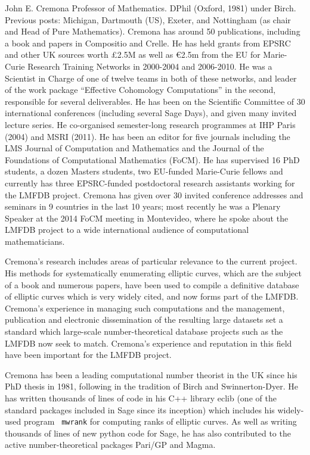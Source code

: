 \begin{participant}[type=leadPI,PM=3,gender=male]{John E. Cremona}
  Professor of Mathematics.  DPhil (Oxford, 1981) under Birch.
  Previous posts: Michigan, Dartmouth (US), Exeter, and Nottingham (as
  chair and Head of Pure Mathematics). Cremona has around 50
  publications, including a book and papers in Compositio and Crelle.
  He has held grants from EPSRC and other UK sources worth \pounds2.5M
  as well as \euro2.5m from the EU for Marie-Curie Research Training
  Networks in 2000-2004 and 2006-2010.  He was a Scientist in Charge
  of one of twelve teams in both of these networks, and leader of the
  work package ``Effective Cohomology Computations'' in the second,
  responsible for several deliverables.  He has been on the Scientific
  Committee of 30 international conferences (including several Sage
  Days), and given many invited lecture series.  He co-organised
  semester-long research programmes at IHP Paris (2004) and MSRI
  (2011).  He has been an editor for five journals including the LMS
  Journal of Computation and Mathematics and the Journal of the
  Foundations of Computational Mathematics (FoCM).  He has supervised
  16 PhD students, a dozen Masters students, two EU-funded Marie-Curie
  fellows and currently has three EPSRC-funded postdoctoral research
  assistants working for the LMFDB project.  Cremona has given over 30
  invited conference addresses and seminars in 9 countries in the last
  10 years; most recently he was a Plenary Speaker at the 2014 FoCM
  meeting in Montevideo, where he spoke about the LMFDB project to a
  wide international audience of computational mathematicians.

  Cremona's research includes areas of particular relevance to the
  current project.  His methods for systematically enumerating
  elliptic curves, which are the subject of a book and numerous
  papers, have been used to compile a definitive database of elliptic
  curves which is very widely cited, and now forms part of the LMFDB.
  Cremona's experience in managing such computations and the
  management, publication and electronic dissemination of the
  resulting large datasets set a standard which large-scale
  number-theoretical database projects such as the LMFDB now seek to
  match.  Cremona's experience and reputation in this field have been
  important for the LMFDB project.

  Cremona has been a leading computational number theorist in the UK
  since his PhD thesis in 1981, following in the tradition of Birch
  and Swinnerton-Dyer.  He has written thousands of lines of code in
  his C++ library eclib (one of the standard packages included in Sage
  since its inception) which includes his widely-used program {\tt
    mwrank} for computing ranks of elliptic curves.  As well as
  writing thousands of lines of new python code for Sage, he has also
  contributed to the active number-theoretical packages Pari/GP and
  Magma.
\end{participant}
